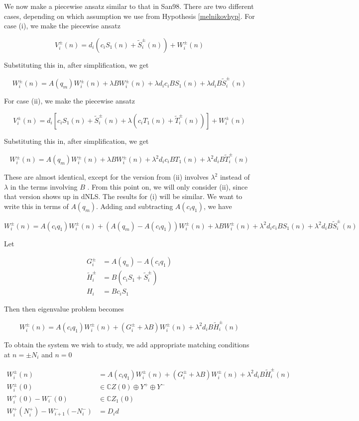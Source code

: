 \documentclass[12pt]{article}
\def\C{{\mathbb C}}
\begin{document}
We now make a piecewise ansatz similar to that in San98. There are two different cases, depending on which assumption we use from Hypothesis \ref{melnikovhyp}. For case (i), we make the piecewise ansatz

\[
V_i^\pm(n) = d_i ( c_i S_1(n) + \tilde{S}_i^\pm(n) ) + W_i^\pm(n)
\]

Substituting this in, after simplification, we get

\[
W_i^\pm(n) = A(q_m) W_i^\pm(n) + \lambda B W_i^\pm(n) + \lambda d_i c_i B S_1(n) + \lambda d_i B \tilde{S}_i^\pm(n)
\]

For case (ii), we make the piecewise ansatz

\[
V_i^\pm(n) = d_i [ c_i S_1(n) + \tilde{S}_i^\pm(n) + \lambda(c_i T_1(n) + \tilde{T}_i^\pm(n))] + W_i^\pm(n)
\]

Substituting this in, after simplification, we get

\[
W_i^\pm(n) = A(q_m) W_i^\pm(n) + \lambda B W_i^\pm(n) + \lambda^2 d_i c_i B T_1(n) + \lambda^2 d_i B \tilde{T}_i^\pm(n)
\]

These are almost identical, except for the version from (ii) involves $\lambda^2$ instead of $\lambda$ in the terms involving $B$ . From this point on, we will only consider (ii), since that version shows up in dNLS. The results for (i) will be similar. We want to write this in terms of $A(q_m)$. Adding and subtracting $A(c_i q_1)$, we have

\[
W_i^\pm(n) = A(c_i q_1) W_i^\pm(n) + (A(q_m) - A(c_i q_1)) W_i^\pm(n) + \lambda B W_i^\pm(n) + \lambda^2 d_i c_i B S_1(n) + \lambda^2 d_i B \tilde{S}_i^\pm(n)
\]

Let

\begin{align*}
G_i^\pm &= A(q_n) - A(c_i q_1) \\
\tilde{H}_i^\pm &= B( c_i S_1 + \tilde{S}_i^\pm ) \\
H_i &= B c_i S_1
\end{align*}

Then then eigenvalue problem becomes

\[
W_i^\pm(n) = A(c_i q_1) W_i^\pm(n) + (G_i^\pm + \lambda B) W_i^\pm(n) + \lambda^2 d_i B \tilde{H}_i^\pm(n)
\]

To obtain the system we wish to study, we add appropriate matching conditions at $n = \pm N_i$ and $n = 0$

\begin{align*}
W_i^\pm(n) &= A(c_i q_1) W_i^\pm(n) + (G_i^\pm + \lambda B) W_i^\pm(n) + \lambda^2 d_i B \tilde{H}_i^\pm(n) \\
W_i^\pm(0) &\in \C Z(0) \oplus Y^+ \oplus Y^- \\
W_i^+(0) - W_i^-(0) &\in \C Z_1(0) \\
W_i^+(N_i^+) - W_{i+1}^-(-N_i^-) &= D_i d
\end{align*}
\end{document}
